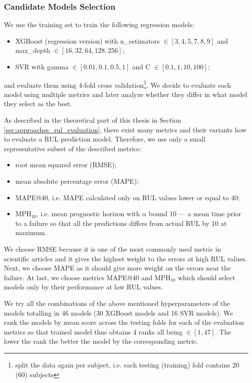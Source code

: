 \subsubsection{Candidate Models Selection}

We use the training set to train the following regression models:
\begin{itemize}
    \item XGBoost (regression version) with n\_estimators $\in [3, 4, 5, 7, 8, 9]$ and max\_depth $\in [16, 32, 64, 128, 256]$;
    \item SVR with gamma $\in [0.01, 0.1, 0.5, 1]$ and C $\in [0.1, 1, 10, 100]$;
\end{itemize}
and evaluate them using 4-fold cross validation\footnote{split the data again per subject, i.e. each testing (training) fold contains 20 (60) subjects}.
We decide to evaluate each model using multiple metrics and later analyze whether they differ in what model they select as the best.

As described in the theoretical part of this thesis in Section \ref{sec:approaches_rul_evaluation}, there exist many metrics and their variants how to evaluate a RUL prediction model.
Therefore, we use only a small representative subset of the described metrics:
\begin{itemize}
    \item root mean squared error (RMSE);
    \item mean absolute percentage error (MAPE);
    \item MAPE@40, i.e. MAPE calculated only on RUL values lower or equal to 40;
    \item MPH$_{10}$, i.e. mean prognostic horizon with $\alpha$ bound 10 --- a mean time prior to a failure so that all the predictions differs from actual RUL by 10 at maximum.
\end{itemize}
We choose RMSE because it is one of the most commonly used metric in scientific articles \cite{mosallam2016data, ellefsen2019remaining, babu2016deep, peng2019bayesian} and it gives the highest weight to the errors at high RUL values.
Next, we choose MAPE as it should give more weight on the errors near the failure.
At last, we choose metrics MAPE@40 and MPH$_{10}$ which should select models only by their performance at low RUL values.

We try all the combinations of the above mentioned hyperparameters of the models totalling in 46 models (30 XGBoost models and 16 SVR models).
We rank the models by mean score across the testing folds for each of the evaluation metrics so that trained model thus obtains 4 ranks all being $\in [1, 47]$.
The lower the rank the better the model by the corresponding metric.

